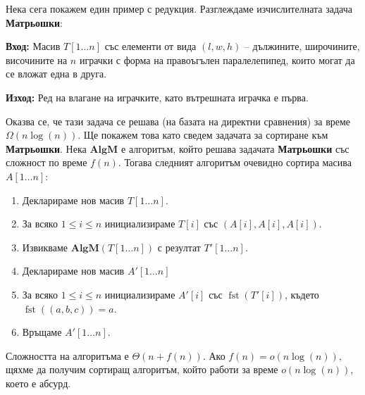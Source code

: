 \documentclass{article}
\theoremstyle{definition}
\theoremstyle{plain}
\theoremstyle{remark}
\theoremstyle{definition}
\begin{document}
Нека сега покажем един пример с редукция.
Разглеждаме изчислителната задача \textbf{Матрьошки}:

\textbf{Вход:} Масив $T[1 \dots n]$ със елементи от вида $(l, w, h)$ -- дължините, широчините, височините на $n$ играчки с форма на правоъгълен паралелепипед, които могат да се вложат една в друга.

\textbf{Изход:} Ред на влагане на играчките, като вътрешната играчка е първа.

Оказва се, че тази задача се решава (на базата на директни сравнения) за време $\Omega(n \log(n))$.
Ще покажем това като сведем задачата за сортиране към \textbf{Матрьошки}.
Нека $\mathbf{AlgM}$ е алгоритъм, който решава задачата \textbf{Матрьошки} със сложност по време $f(n)$.
Тогава следният алгоритъм очевидно сортира масива $A[1 \dots n]$:
\begin{enumerate}
    \item Декларираме нов масив $T[1 \dots n]$.
    \item За всяко $1 \leq i \leq n$ инициализираме $T[i]$ със $(A[i], A[i], A[i])$.
    \item Извикваме $\mathbf{AlgM}(T[1 \dots n])$ с резултат $T'[1 \dots n]$.
    \item Декларираме нов масив $A'[1 \dots n]$
    \item За всяко $1 \leq i \leq n$ инициализираме $A'[i]$ със $\operatorname{fst}(T'[i])$, където $\operatorname{fst}((a, b, c)) = a$.
    \item Връщаме $A'[1 \dots n]$.
\end{enumerate}
Сложността на алгоритъма е $\Theta(n + f(n))$.
Ако $f(n) = o(n \log(n))$, щяхме да получим сортиращ алгоритъм, който работи за време $o(n \log(n))$, което е абсурд.
\end{document}

